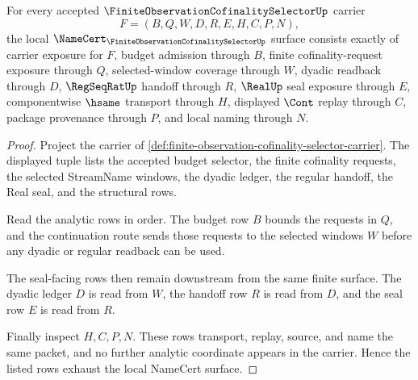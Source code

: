 \begin{theorem}
\label{thm:finite-observation-cofinality-selector-namecert-obligations}
For every accepted $\FiniteObservationCofinalitySelectorUp$ carrier
$$
F=(B,Q,W,D,R,E,H,C,P,N),
$$
the local $\NameCert_{\FiniteObservationCofinalitySelectorUp}$ surface consists exactly of carrier exposure for $F$, budget admission through $B$, finite cofinality-request exposure through $Q$, selected-window coverage through $W$, dyadic readback through $D$, $\RegSeqRatUp$ handoff through $R$, $\RealUp$ seal exposure through $E$, componentwise $\hsame$ transport through $H$, displayed $\Cont$ replay through $C$, package provenance through $P$, and local naming through $N$.
\end{theorem}
\begin{proof}
Project the carrier of \autoref{def:finite-observation-cofinality-selector-carrier}. The displayed tuple lists the accepted budget selector, the finite cofinality requests, the selected StreamName windows, the dyadic ledger, the regular handoff, the Real seal, and the structural rows.

Read the analytic rows in order. The budget row $B$ bounds the requests in $Q$, and the continuation route sends those requests to the selected windows $W$ before any dyadic or regular readback can be used.

The seal-facing rows then remain downstream from the same finite surface. The dyadic ledger $D$ is read from $W$, the handoff row $R$ is read from $D$, and the seal row $E$ is read from $R$.

Finally inspect $H,C,P,N$. These rows transport, replay, source, and name the same packet, and no further analytic coordinate appears in the carrier. Hence the listed rows exhaust the local NameCert surface.
\end{proof}

